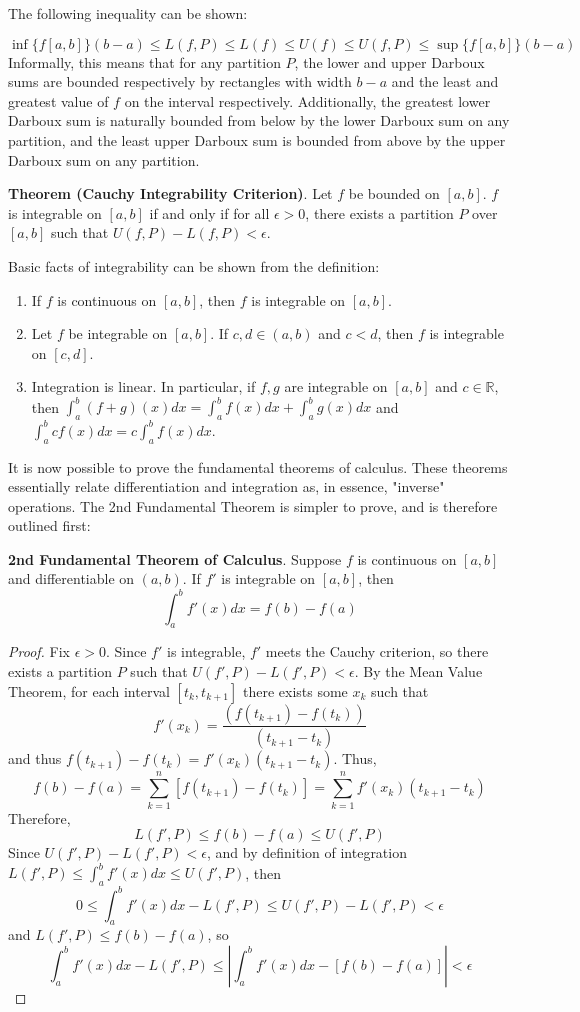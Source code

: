 The following inequality can be shown:

\[\inf \{f[a,b]\}(b-a)\leq L(f,P)\leq L(f)\leq U(f) \leq U(f,P) \leq \sup\{f[a,b]\}(b-a)\] Informally, this means that for any partition $P$, the lower and upper Darboux sums are bounded respectively by rectangles with width $b-a$ and the least and greatest value of $f$ on the interval respectively. Additionally, the greatest lower Darboux sum is naturally bounded from below by the lower Darboux sum on any partition, and the least upper Darboux sum is bounded from above by the upper Darboux sum on any partition.

\textbf{Theorem (Cauchy Integrability Criterion)}. Let $f$ be bounded on $[a,b]$. $f$ is integrable on $[a,b]$ if and only if for all $\epsilon>0$, there exists a partition $P$ over $[a,b]$ such that $U(f,P)-L(f,P)<\epsilon$.

\newpage

Basic facts of integrability can be shown from the definition:

\begin{enumerate}
    \item[] If $f$ is continuous on $[a,b]$, then $f$ is integrable on $[a,b]$.
    \item[] Let $f$ be integrable on $[a,b]$. If $c,d\in(a,b)$ and $c<d$, then $f$ is integrable on $[c,d]$.
    \item[] Integration is linear. In particular, if $f,g$ are integrable on $[a,b]$ and $c\in\mathbb{R}$, then $\int_a^b (f+g)(x)dx = \int_a^b f(x)dx+\int_a^b g(x)dx$ and $\int_a^b cf(x)dx = c\int_a^b f(x)dx$.
\end{enumerate}

It is now possible to prove the fundamental theorems of calculus. These theorems essentially relate differentiation and integration as, in essence, "inverse" operations. The 2nd Fundamental Theorem is simpler to prove, and is therefore outlined first:

\textbf{2nd Fundamental Theorem of Calculus}. Suppose $f$ is continuous on $[a,b]$ and differentiable on $(a,b)$. If $f'$ is integrable on $[a,b]$, then \[\int_a^b f'(x)dx = f(b)-f(a)\]

\begin{proof}
    Fix $\epsilon>0$. Since $f'$ is integrable, $f'$ meets the Cauchy criterion, so there exists a partition $P$ such that $U(f',P)-L(f',P)<\epsilon$. By the Mean Value Theorem, for each interval $[t_k,t_{k+1}]$ there exists some $x_k$ such that \[f'(x_k) = \frac{(f(t_{k+1})-f(t_k))}{(t_{k+1}-t_k)}\] and thus $f(t_{k+1})-f(t_k) = f'(x_k)(t_{k+1}-t_k)$. Thus, \[f(b)-f(a) = \sum_{k=1}^n [f(t_{k+1})-f(t_k)] = \sum_{k=1}^n f'(x_k)(t_{k+1}-t_k)\] Therefore, \[L(f',P)\leq f(b)-f(a)\leq U(f',P)\] Since $U(f',P)-L(f',P)<\epsilon$, and by definition of integration $L(f',P)\leq \int_a^bf'(x)dx\leq U(f',P)$, then \[0 \leq \int_a^b f'(x)dx - L(f',P) \leq U(f',P)-L(f',P)<\epsilon\] and $L(f',P)\leq f(b)-f(a)$, so \[\int_a^b f'(x)dx - L(f',P) \leq \left|\int_a^b f'(x)dx - [f(b)-f(a)]\right| < \epsilon\]
\end{proof}


